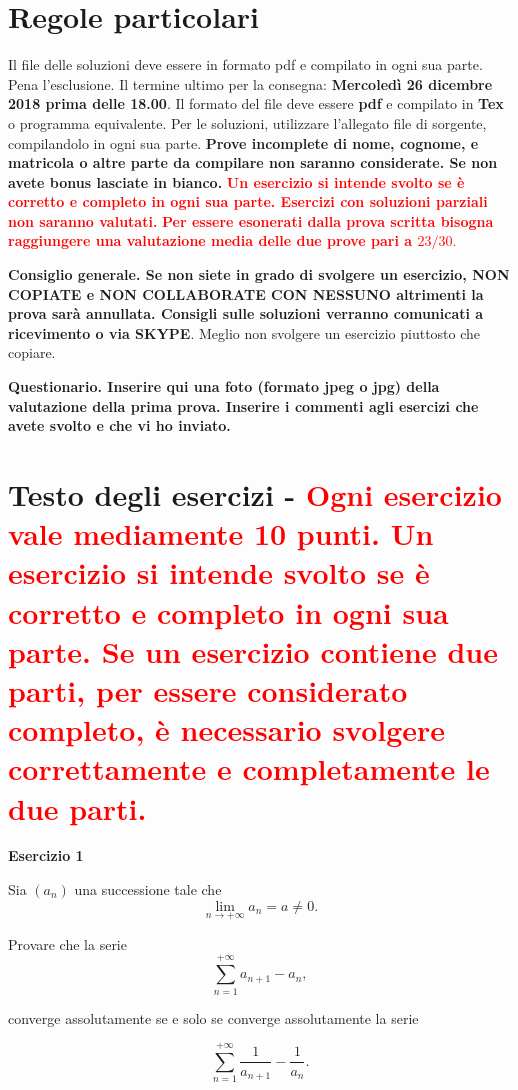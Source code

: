 \documentclass[12pt, oneside]{article}   	%
\begin{document}
\section{Regole particolari}
 Il file delle soluzioni deve essere in formato pdf e compilato in ogni sua parte. Pena l'esclusione. Il termine ultimo per la consegna: {\bf Mercoled\`i 26 dicembre 2018 prima delle 18.00}. Il formato del file deve essere {\bf pdf} e compilato in {\bf Tex} o programma equivalente.
Per le soluzioni, utilizzare l'allegato file di sorgente, compilandolo in ogni sua parte. {\bf Prove incomplete di nome, cognome, e matricola  o altre parte da compilare non saranno considerate. Se non avete bonus lasciate in bianco.}
{ \textcolor{red}{\bf Un esercizio si intende svolto se \`e corretto e completo in ogni sua parte. Esercizi con soluzioni parziali non saranno valutati.}}
{\bf  \textcolor{red}{\bf Per essere esonerati dalla prova scritta bisogna raggiungere una valutazione media delle due prove pari a $23/30.$}}

{\bf Consiglio generale. Se non siete in grado di svolgere un esercizio, {\bf NON COPIATE
e NON COLLABORATE CON NESSUNO altrimenti la prova sar\`a annullata.} Consigli sulle soluzioni verranno comunicati
a ricevimento o via SKYPE}. Meglio non svolgere un esercizio piuttosto che copiare.

{\bf Questionario. Inserire qui una foto (formato jpeg o jpg) della valutazione della prima
prova. Inserire i commenti agli esercizi che avete svolto e che vi ho inviato.}





\section{Testo degli esercizi - {\bf \textcolor{red}{Ogni esercizio vale mediamente 10 punti. Un esercizio si intende svolto se \`e corretto e completo in ogni sua parte.
Se un esercizio contiene due parti, per essere considerato completo, \`e necessario svolgere  correttamente e completamente le due parti.}}}
{\bf Esercizio 1}

 Sia $(a_n)$ una successione tale che
$$\lim_{n\to+\infty} a_n= a\neq 0.$$

Provare che la serie
$$\sum_{n=1}^{+\infty} a_{n+1}-a_n, $$

converge assolutamente se e solo se converge assolutamente la serie

$$ \sum_{n=1}^{+\infty} \frac{1}{a_{n+1}} -  \frac{1}{a_{n}}.$$
\end{document}
